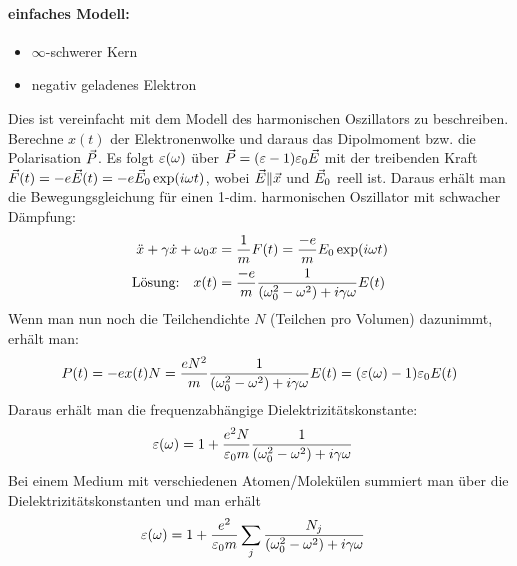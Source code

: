 \paragraph{einfaches Modell:}
\begin{itemize}
	\item$\infty$-schwerer Kern
	\item negativ geladenes Elektron
\end{itemize}
Dies ist vereinfacht mit dem Modell des harmonischen Oszillators zu
beschreiben. Berechne $x(t)$ der Elektronenwolke und daraus das
Dipolmoment bzw. die Polarisation $\vec{P}$. Es folgt $\varepsilon(\omega)$
über $\vec{P}=(\varepsilon-1)\varepsilon_0 \vec{E}$ mit der treibenden Kraft
$\vec{F}(t)=-e\vec{E}(t)=-e\vec{E}_0 \exp(i\omega t)$, wobei $\vec{E}\|\vec{x}$
und $\vec{E}_0$ reell ist. 
Daraus erhält man die Bewegungsgleichung für einen 1-dim. harmonischen
Oszillator mit schwacher Dämpfung:
\begin{align*}
  \ddot{x}+\gamma\dot{x}+\omega_0 x
  &=\frac{1}{m} F(t)
    =\frac{-e}{m}E_0\exp(i\omega t)\\
  \text{Lösung:}\quad 
  x(t)
  &=\frac{-e}{m}\frac{1}{(\omega_0^2-\omega^2)+i\gamma\omega}E(t)
\end{align*}
Wenn man nun noch die Teilchendichte $N$ (Teilchen pro Volumen)
dazunimmt, erhält man:
\begin{align*}
	P(t) &= -ex(t)N
           = \frac{eN^2}{m} 
           \frac{1}{(\omega_0^2-\omega^2) + i\gamma\omega} E(t)
           =(\varepsilon(\omega)-1)\varepsilon_0 E(t)\\
\end{align*}
Daraus erhält man die frequenzabhängige Dielektrizitätskonstante: 
\begin{align*}
	 \varepsilon(\omega) &= 1 + \frac{e^2N}{\varepsilon_0 m}
                    \frac{1}{(\omega_0^2 - \omega^2) + i\gamma\omega}
\end{align*}
Bei einem Medium mit verschiedenen Atomen/Molekülen summiert man über
die Dielektrizitätskonstanten und man erhält
\begin{align*}
	 \varepsilon(\omega) &= 1 + \frac{e^2}{\varepsilon_0 m}
                    \sum_{j} \frac{N_j}{(\omega_0^2-\omega^2)+i\gamma\omega}
\end{align*}


